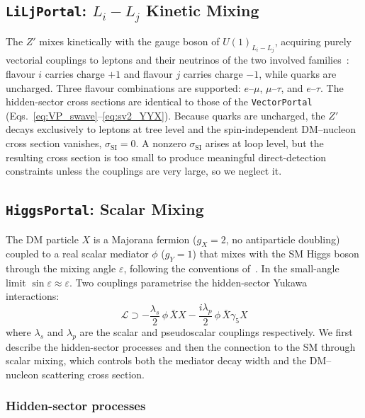 \documentclass[11pt]{article}
\numberwithin{equation}{section}
\newcommand{\epsX}{\varepsilon}
\begin{document}
\subsection{\texttt{LiLjPortal}: $L_i - L_j$ Kinetic Mixing}
\label{sec:LiLj}

The $Z'$ mixes kinetically with the gauge boson of $U(1)_{L_i - L_j}$, acquiring purely vectorial couplings to leptons and their neutrinos of the two involved families~\cite{Hooper:2019xss}: flavour $i$ carries charge $+1$ and flavour $j$ carries charge $-1$, while quarks are uncharged. Three flavour combinations are supported: $e$--$\mu$, $\mu$--$\tau$, and $e$--$\tau$. The hidden-sector cross sections are identical to those of the \texttt{VectorPortal} (Eqs.~\eqref{eq:VP_swave}--\eqref{eq:sv2_YYX}). Because quarks are uncharged, the $Z'$ decays exclusively to leptons at tree level and the spin-independent DM--nucleon cross section vanishes, $\sigma_{\text{SI}} = 0$. A nonzero $\sigma_{\text{SI}}$ arises at loop level, but the resulting cross section is too small to produce meaningful direct-detection constraints unless the couplings are very large, so we neglect it.

\subsection{\texttt{HiggsPortal}: Scalar Mixing}
\label{sec:HP}

The DM particle $X$ is a Majorana fermion ($g_X = 2$, no antiparticle doubling) coupled to a real scalar mediator $\phi$ ($g_Y = 1$) that mixes with the SM Higgs boson through the mixing angle $\epsX$, following the conventions of~\cite{Hooper:2019xss}. In the small-angle limit $\sin\epsX \approx \epsX$. Two couplings parametrise the hidden-sector Yukawa interactions:
\begin{equation}
    \mathcal{L} \supset -\frac{\lambda_s}{2}\,\phi\,\bar{X}X - \frac{i\lambda_p}{2}\,\phi\,\bar{X}\gamma_5 X
\end{equation}
where $\lambda_s$ and $\lambda_p$ are the scalar and pseudoscalar couplings respectively. We first describe the hidden-sector processes and then the connection to the SM through scalar mixing, which controls both the mediator decay width and the DM--nucleon scattering cross section.

\subsubsection{Hidden-sector processes}
\label{sec:HP_dark}
\end{document}
